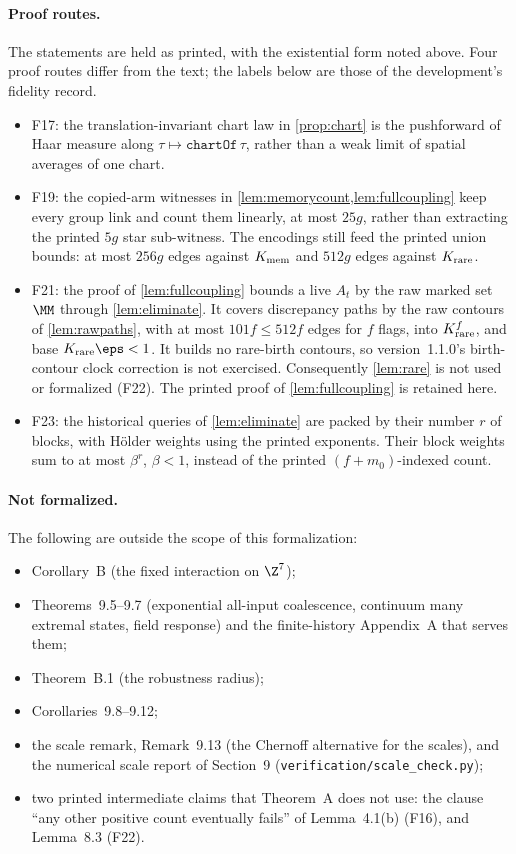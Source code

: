 \paragraph{Proof routes.} The statements are held as printed, with the existential form noted above. Four proof routes differ from the text; the labels below are those of the development's fidelity record.
\begin{itemize}
\item F17: the translation-invariant chart law in \cref{prop:chart} is the pushforward of Haar measure along $\tau\mapsto\texttt{chartOf}\,\tau$, rather than a weak limit of spatial averages of one chart.
\item F19: the copied-arm witnesses in \cref{lem:memorycount,lem:fullcoupling} keep every group link and count them linearly, at most $25g$, rather than extracting the printed $5g$ star sub-witness. The encodings still feed the printed union bounds: at most $256g$ edges against $K_{\rm mem}$ and $512g$ edges against $K_{\rm rare}$.
\item F21: the proof of \cref{lem:fullcoupling} bounds a live $A_t$ by the raw marked set $\MM$ through \cref{lem:eliminate}. It covers discrepancy paths by the raw contours of \cref{lem:rawpaths}, with at most $101f\le512f$ edges for $f$ flags, into $K_{\rm rare}^f$, and base $K_{\rm rare}\eps<1$. It builds no rare-birth contours, so version~1.1.0's birth-contour clock correction is not exercised. Consequently \cref{lem:rare} is not used or formalized (F22). The printed proof of \cref{lem:fullcoupling} is retained here.
\item F23: the historical queries of \cref{lem:eliminate} are packed by their number $r$ of blocks, with H\"older weights using the printed exponents. Their block weights sum to at most $\beta^r$, $\beta<1$, instead of the printed $(f+m_0)$-indexed count.
\end{itemize}

\paragraph{Not formalized.} The following are outside the scope of this formalization:
\begin{itemize}
\item Corollary~B (the fixed interaction on $\Z^7$);
\item Theorems~9.5--9.7 (exponential all-input coalescence, continuum many extremal states, field response) and the finite-history Appendix~A that serves them;
\item Theorem~B.1 (the robustness radius);
\item Corollaries~9.8--9.12;
\item the scale remark, Remark~9.13 (the Chernoff alternative for the scales), and the numerical scale report of Section~9 (\texttt{verification/scale\_check.py});
\item two printed intermediate claims that Theorem~A does not use: the clause ``any other positive count eventually fails'' of Lemma~4.1(b) (F16), and Lemma~8.3 (F22).
\end{itemize}

